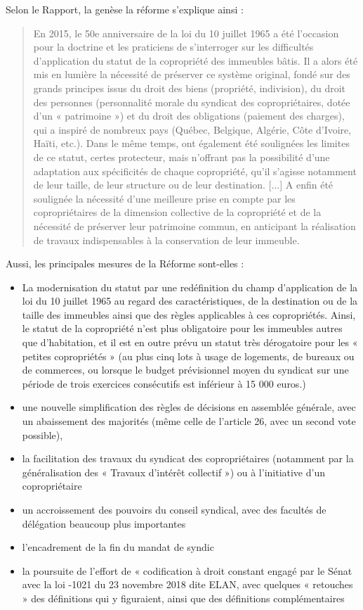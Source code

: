 			Selon le Rapport, la genèse la réforme s’explique ainsi :
			\begin{quote}
				En 2015, le 50e anniversaire de la loi du 10 juillet 1965 a été l’occasion pour la doctrine et les praticiens de s’interroger sur les difficultés d’application du statut de la copropriété des immeubles bâtis.
				Il a alors été mis en lumière la nécessité de préserver ce système original, fondé sur des grands principes issus du droit des biens (propriété, indivision), du droit des personnes (personnalité morale du syndicat des copropriétaires, dotée d’un « patrimoine ») et du droit des obligations (paiement des charges), qui a inspiré de nombreux pays (Québec, Belgique, Algérie, Côte d’Ivoire, Haïti, etc.). Dans le même temps, ont également été soulignées les limites de ce statut, certes protecteur, mais n’offrant pas la possibilité d’une adaptation aux spécificités de chaque copropriété, qu’il s’agisse notamment de leur taille, de leur structure ou de leur destination. [$\dots$]
				A enfin été soulignée la nécessité d’une meilleure prise en compte par les copropriétaires de la dimension collective de la copropriété et de la nécessité de préserver leur patrimoine commun, en anticipant la réalisation de travaux indispensables à la conservation de leur immeuble.
			\end{quote}
			
			Aussi, les principales mesures de la Réforme sont-elles :
			\begin{itemize}
				\item La modernisation du statut par une redéfinition du champ d’application de la loi du 10 juillet 1965 au regard des caractéristiques, de la destination ou de la taille des immeubles ainsi que des règles applicables à ces copropriétés. Ainsi, le statut de la copropriété n’est plus obligatoire pour les immeubles autres que d’habitation, et il est en outre prévu un statut très dérogatoire pour les « petites copropriétés » (au plus cinq lots à usage de logements, de bureaux ou de commerces, ou lorsque le budget prévisionnel moyen du syndicat sur une période de trois exercices consécutifs est inférieur à 15 000 euros.)
				\item  une nouvelle simplification des règles de décisions en assemblée générale, avec un abaissement des majorités (même celle de l’article 26, avec un second vote possible),
				\item  la facilitation des travaux du syndicat des copropriétaires (notamment par la généralisation des « Travaux d’intérêt collectif ») ou à l’initiative d’un copropriétaire
				\item  un accroissement des pouvoirs du conseil syndical, avec des facultés de délégation beaucoup plus importantes
				\item  l’encadrement de la fin du mandat de syndic
				\item  la poursuite de l’effort de « codification à droit constant engagé par le Sénat avec la loi -1021 du 23 novembre 2018 dite ELAN, avec quelques « retouches » des définitions qui y figuraient, ainsi que des définitions complémentaires
			\end{itemize}

	